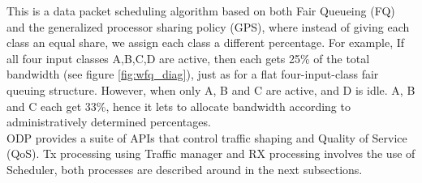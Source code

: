 This is a data packet scheduling algorithm based on both Fair Queueing (FQ) and the generalized processor sharing policy (GPS), where instead of giving each class an equal share, we assign each class a different percentage. For example, If all four input classes A,B,C,D are active, then each gets 25\% of the total bandwidth (see figure \ref{fig:wfq_diag}), just as for a flat four-input-class fair queuing structure. However, when only A, B and C are active, and D is idle.  A, B and C each get 33\%, hence it lets to allocate bandwidth according to administratively determined percentages.\\ 
ODP provides a suite of APIs that control traffic shaping and Quality of Service (QoS). Tx processing using Traffic manager and RX processing involves the use of Scheduler, both processes are described around in the next subsections.






